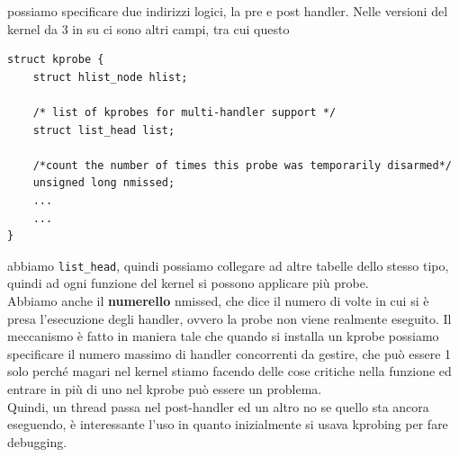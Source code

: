 \documentclass[12pt, oneside]{extbook}
\begin{document}
possiamo specificare due indirizzi logici, la pre e post handler. Nelle versioni del kernel da 3 in su ci sono altri campi, tra cui questo
\begin{lstlisting}
struct kprobe {
	struct hlist_node hlist;
	
	/* list of kprobes for multi-handler support */
	struct list_head list;
	
	/*count the number of times this probe was temporarily disarmed*/
	unsigned long nmissed;
	...
	...
}
\end{lstlisting}
abbiamo \texttt{list\_head}, quindi possiamo collegare ad altre tabelle dello stesso tipo, quindi ad ogni funzione del kernel si possono applicare più probe.\\Abbiamo anche il \textbf{\textsf{numerello}} nmissed, che dice il numero di volte in cui si è presa l'esecuzione degli handler, ovvero la probe non viene realmente eseguito. Il meccanismo è fatto in maniera tale che quando si installa un kprobe possiamo specificare il numero massimo di handler concorrenti da gestire, che può essere 1 solo perché magari nel kernel stiamo facendo delle cose critiche nella funzione ed entrare in più di uno nel kprobe può essere un problema.\\Quindi, un thread passa nel post-handler ed un altro no se quello sta ancora eseguendo, è interessante l'uso in quanto inizialmente si usava kprobing per fare debugging.
\end{document}
